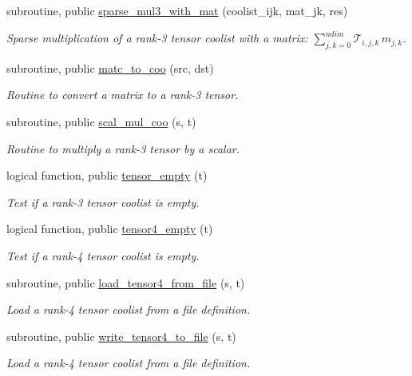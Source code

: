 \begin{DoxyCompactItemize}
subroutine, public \hyperlink{namespacetensor_a33bc74f9042478d58240b1a1a91db91d}{sparse\+\_\+mul3\+\_\+with\+\_\+mat} (coolist\+\_\+ijk, mat\+\_\+jk, res)
\begin{DoxyCompactList}\small\item\em Sparse multiplication of a rank-\/3 tensor coolist with a matrix\+: ${\displaystyle \sum_{j,k=0}^{ndim}} \mathcal{T}_{i,j,k} \, m_{j,k}$. \end{DoxyCompactList}\item 
subroutine, public \hyperlink{namespacetensor_ad868662d382dc1579db6847f2411c382}{matc\+\_\+to\+\_\+coo} (src, dst)
\begin{DoxyCompactList}\small\item\em Routine to convert a matrix to a rank-\/3 tensor. \end{DoxyCompactList}\item 
subroutine, public \hyperlink{namespacetensor_af105ec6083969c52f5e7422d75a5cda5}{scal\+\_\+mul\+\_\+coo} (s, t)
\begin{DoxyCompactList}\small\item\em Routine to multiply a rank-\/3 tensor by a scalar. \end{DoxyCompactList}\item 
logical function, public \hyperlink{namespacetensor_ab08af814baeb0b670bd5d587ca578239}{tensor\+\_\+empty} (t)
\begin{DoxyCompactList}\small\item\em Test if a rank-\/3 tensor coolist is empty. \end{DoxyCompactList}\item 
logical function, public \hyperlink{namespacetensor_a9b00b4f3cebb865971bcbaf818602ddc}{tensor4\+\_\+empty} (t)
\begin{DoxyCompactList}\small\item\em Test if a rank-\/4 tensor coolist is empty. \end{DoxyCompactList}\item 
subroutine, public \hyperlink{namespacetensor_a373dab2b483b4bc5f521934660d289aa}{load\+\_\+tensor4\+\_\+from\+\_\+file} (s, t)
\begin{DoxyCompactList}\small\item\em Load a rank-\/4 tensor coolist from a file definition. \end{DoxyCompactList}\item 
subroutine, public \hyperlink{namespacetensor_a328cec7eb0ae3c472db0f9ccdd475763}{write\+\_\+tensor4\+\_\+to\+\_\+file} (s, t)
\begin{DoxyCompactList}\small\item\em Load a rank-\/4 tensor coolist from a file definition. \end{DoxyCompactList}\end{DoxyCompactItemize}

